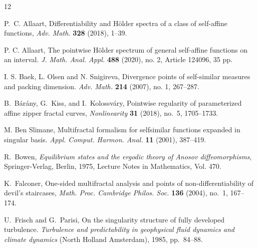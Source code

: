 \documentclass[11pt]{amsart}
\newcommand{\1}{1}
\begin{document}
\begin{thebibliography}{12}

P.~C. Allaart, Differentiability and {H}\"{o}lder spectra of a class of
  self-affine functions, {\em Adv. Math.} \textbf{328} (2018), 1--39. %

{P. C. Allaart}, The pointwise H\"older spectrum of general self-affine functions on an interval. {\em J. Math. Anal. Appl.} {\bf 488} (2020), no. 2, Article 124096, 35 pp.

{I. S. Baek}, {L. Olsen} and {N. Snigireva}, Divergence points of self-similar measures and packing dimension. 
{\em Adv. Math.} {\bf 214} (2007), no. 1, 267--287.

B.~B\'{a}r\'{a}ny, G.~Kiss, and I.~Kolossv\'{a}ry, Pointwise regularity
  of parameterized affine zipper fractal curves, {\em Nonlinearity} \textbf{31} (2018), no.~5, 1705--1733. %


{M. Ben Slimane}, Multifractal formalism for selfsimilar functions expanded in singular basis. {\em Appl. Comput. Harmon. Anal.} {\bf 11} (2001), 387--419.

R.~Bowen, \emph{Equilibrium states and the ergodic theory of {A}nosov
  diffeomorphisms}, Springer-Verlag, Berlin, 1975, Lecture Notes in
  Mathematics, Vol. 470. %


K.~Falconer, One-sided multifractal analysis and points of
  non-differentiability of devil's staircases, {\em Math. Proc. Cambridge Philos.  Soc.} \textbf{136} (2004), no.~1, 167--174. %

U.~Frisch and G.~Parisi, On the singularity structure of fully developed
  turbulence. {\em Turbulence and predictability in geophysical fluid dynamics and climate dynamics} (North Holland Amsterdam), 1985, pp.~84--88.



\end{thebibliography}
\end{document}
